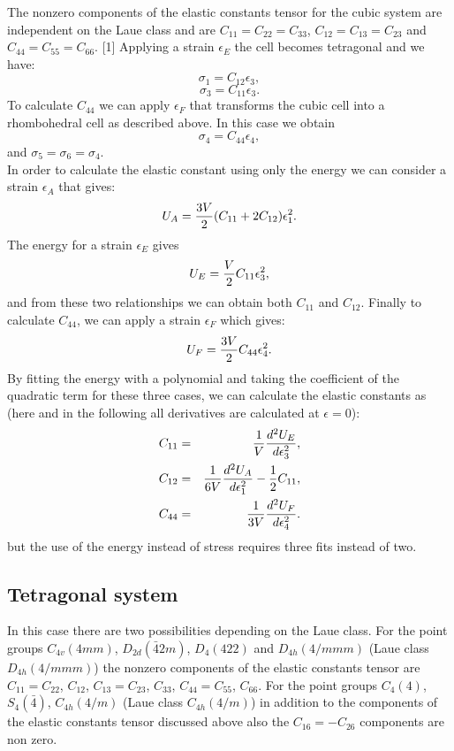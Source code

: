 \documentclass[12pt,a4paper]{article}
\begin{document}
The nonzero components of the elastic constants tensor for the cubic system
are independent on the Laue class and are $C_{11}=C_{22}=C_{33}$,
$C_{12}=C_{13}=C_{23}$ and $C_{44}=C_{55}=C_{66}$. [1]
Applying a strain $\epsilon_E$ the cell becomes tetragonal and we have:
\begin{equation}
\sigma_{1} = C_{12} \epsilon_3,
\end{equation}
\begin{equation}
\sigma_{3} = C_{11} \epsilon_3.
\end{equation}
To calculate $C_{44}$ we can apply $\epsilon_F$ that
transforms the cubic cell into a rhombohedral cell as described above. In
this case we obtain
\begin{equation}
\sigma_{4} = C_{44} \epsilon_4,
\end{equation}
and $\sigma_{5} = \sigma_{6} = \sigma_{4}$. \\
In order to calculate the elastic constant using only the energy
we can consider a strain $\epsilon_A$ that gives:
\begin{equation}
U_A = {3 V \over 2} (C_{11} + 2C_{12}) \epsilon_1^2.
\end{equation}
The energy for a strain $\epsilon_E$ gives
\begin{equation}
U_E = {V \over 2} C_{11} \epsilon_3^2,
\end{equation}
and from these two relationships we can obtain both $C_{11}$ and $C_{12}$.
Finally to calculate $C_{44}$, we can apply a strain $\epsilon_F$ 
which gives:
\begin{equation}
U_F = {3 V \over 2} C_{44} \epsilon_4^2.
\end{equation}
By fitting the energy with a polynomial and taking the coefficient of
the quadratic term for these three cases, we can calculate the elastic 
constants as (here and in the following all derivatives are calculated
at $\epsilon=0$):
\begin{eqnarray}
C_{11}&=&{1 \over V} {d^2 U_E \over d \epsilon_3^2}, \\ 
C_{12}&=&{1 \over 6 V} {d^2 U_A \over d \epsilon_1^2}  - {1\over 2} C_{11}, \\
C_{44}&=&{1 \over 3 V} {d^2 U_F \over d \epsilon_4^2}.
\end{eqnarray}
but the use of the energy instead of stress requires three fits instead
of two. 

\subsection{\color{web-blue}Tetragonal system}
In this case there are two possibilities depending on the Laue class.
For the point groups $C_{4v} (4mm)$, $D_{2d} (\bar42m)$, $D_4 (422)$ and
$D_{4h} (4/mmm)$ (Laue class $D_{4h} (4/mmm)$) the nonzero components of the 
elastic constants tensor are
$C_{11}=C_{22}$, $C_{12}$, $C_{13}=C_{23}$, $C_{33}$, $C_{44}=C_{55}$, 
$C_{66}$.
For the point groups $C_{4} (4)$, $S_{4} (\bar4)$, $C_{4h} (4/m)$ (Laue class
$C_{4h} (4/m)$) in addition to the components of the elastic constants tensor
discussed above also the $C_{16}=-C_{26}$ components are non zero.
\end{document}
